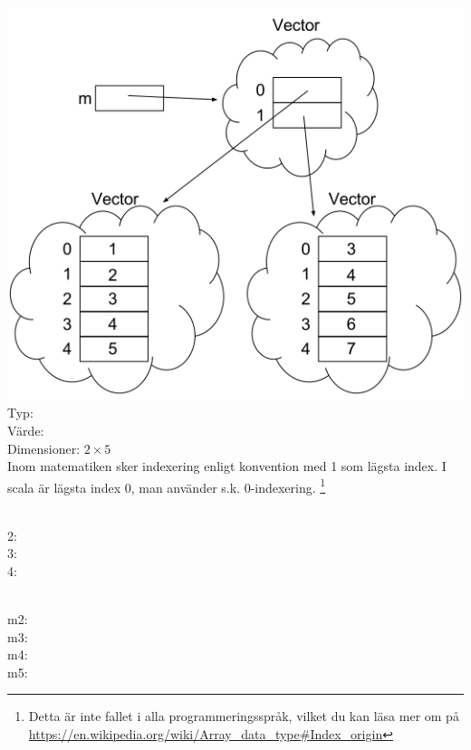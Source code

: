 

\ExerciseSolution{\ExeWeekNINE}


\Task

\Subtask  \includegraphics{../img/w09-solutions/1a} \\
Typ: \\
Värde:  \\
Dimensioner: $2 \times 5$\\
Inom matematiken sker indexering enligt konvention med 1 som lägsta index. I scala är lägsta index 0, man använder s.k. 0-indexering. \footnote{Detta är inte fallet i alla programmeringsspråk, vilket du kan läsa mer om på \url{https://en.wikipedia.org/wiki/Array\_data\_type\#Index\_origin}}

\Subtask \\
2: \\
3: \\
4: 

\Subtask \\
m2: \\
m3: \\
m4: \\
m5: 

